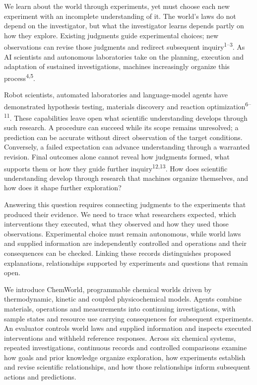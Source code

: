 \documentclass[12pt,a4paper]{article}
\begin{document}
\linenumbers


We learn about the world through experiments, yet must choose each new experiment with an incomplete understanding of it. The world's laws do not depend on the investigator, but what the investigator learns depends partly on how they explore. Existing judgments guide experimental choices; new observations can revise those judgments and redirect subsequent inquiry\textsuperscript{1--3}. As AI scientists and autonomous laboratories take on the planning, execution and adaptation of sustained investigations, machines increasingly organize this process\textsuperscript{4,5}.

Robot scientists, automated laboratories and language-model agents have demonstrated hypothesis testing, materials discovery and reaction optimization\textsuperscript{6--11}. These capabilities leave open what scientific understanding develops through such research. A procedure can succeed while its scope remains unresolved; a prediction can be accurate without direct observation of the target conditions. Conversely, a failed expectation can advance understanding through a warranted revision. Final outcomes alone cannot reveal how judgments formed, what supports them or how they guide further inquiry\textsuperscript{12,13}. How does scientific understanding develop through research that machines organize themselves, and how does it shape further exploration?

Answering this question requires connecting judgments to the experiments that produced their evidence. We need to trace what researchers expected, which interventions they executed, what they observed and how they used those observations. Experimental choice must remain autonomous, while world laws and supplied information are independently controlled and operations and their consequences can be checked. Linking these records distinguishes proposed explanations, relationships supported by experiments and questions that remain open.

We introduce ChemWorld, programmable chemical worlds driven by thermodynamic, kinetic and coupled physicochemical models. Agents combine materials, operations and measurements into continuing investigations, with sample states and resource use carrying consequences for subsequent experiments. An evaluator controls world laws and supplied information and inspects executed interventions and withheld reference responses. Across six chemical systems, repeated investigations, continuous records and controlled comparisons examine how goals and prior knowledge organize exploration, how experiments establish and revise scientific relationships, and how those relationships inform subsequent actions and predictions.
\end{document}
